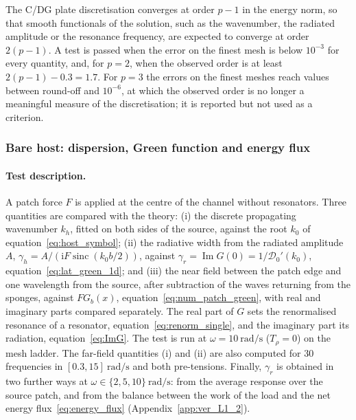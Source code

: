 {The C/DG plate discretisation converges at order $p-1$ in the energy norm, so that smooth functionals of the solution, such as the wavenumber, the radiated amplitude or the resonance frequency, are expected to converge at order $2(p-1)$. A test is passed when the error on the finest mesh is below $10^{-3}$ for every quantity, and, for $p=2$, when the observed order is at least $2(p-1)-0.3=1.7$. For $p=3$ the errors on the finest meshes reach values between round-off and $10^{-6}$, at which the observed order is no longer a meaningful measure of the discretisation; it is reported but not used as a criterion.

\subsubsection{Bare host: dispersion, Green function and energy flux}\label{subsubsec:num_L1_1}

\paragraph{Test description.} A patch force $F$ is applied at the centre of the channel without resonators. Three quantities are compared with the theory: (i) the discrete propagating wavenumber $k_h$, fitted on both sides of the source, against the root $k_0$ of equation~\eqref{eq:host_symbol}; (ii) the radiative width from the radiated amplitude $A$, $\gamma_h=A/(\mathrm{i}F\operatorname{sinc}(k_0b/2))$, against $\gamma_r=\operatorname{Im}G(0)=1/\mathcal{D}_0'(k_0)$, equation~\eqref{eq:lat_green_1d}; and (iii) the near field between the patch edge and one wavelength from the source, after subtraction of the waves returning from the sponges, against $FG_b(x)$, equation~\eqref{eq:num_patch_green}, with real and imaginary parts compared separately. The real part of $G$ sets the renormalised resonance of a resonator, equation~\eqref{eq:renorm_single}, and the imaginary part its radiation, equation~\eqref{eq:ImG}. The test is run at $\omega=10~\si{\radian\per\second}$ ($T_\rho=0$) on the mesh ladder. The far-field quantities (i) and (ii) are also computed for $30$ frequencies in $[0.3,15]~\si{\radian\per\second}$ and both pre-tensions. Finally, $\gamma_r$ is obtained in two further ways at $\omega\in\{2,5,10\}~\si{\radian\per\second}$: from the average response over the source patch, and from the balance between the work of the load and the net energy flux~\eqref{eq:energy_flux} (Appendix~\ref{app:ver_L1_2}).

}
